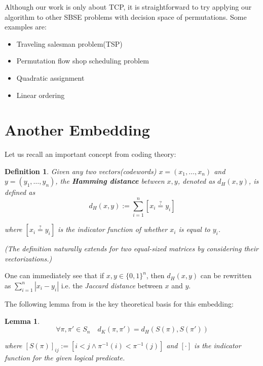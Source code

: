 \documentclass[10pt,journal,compsoc]{IEEEtran}
\newtheorem{definition}{Definition}[section]
\newtheorem{lemma}[theorem]{Lemma}
\begin{document}
	Although our work is only about TCP, it is straightforward to try applying our algorithm to other SBSE problems with decision space of permutations. Some examples are:
	\begin{itemize}
		\item Traveling salesman problem(TSP)
		
		\item Permutation flow shop scheduling problem
		
		\item Quadratic assignment
		
		\item Linear ordering
	\end{itemize}
	
	
	
	\appendices
	\section{Another Embedding}
	\label{sec:appendix}
	Let us recall an important concept from coding theory\cite{coding}:
	\begin{definition}
		Given any two vectors(codewords) $x = (x_1, \dots, x_n)$ and $y = (y_1, \dots, y_n)$, the {\bf Hamming distance} between $x, y$, denoted as $d_H(x, y)$, is defined as
		\[ d_H(x, y) := \sum_{i=1}^n \left[x_i \stackrel{?}{=} y_i\right] \]
		
		where $\left[x_i \stackrel{?}{=} y_i\right]$ is the indicator function of whether $x_i$ is equal to $y_i$.
		
		(The definition naturally extends for two equal-sized matrices by considering their vectorizations.)
	\end{definition}
	
	One can immediately see that if $x, y \in \{0, 1\}^n$, then $d_H(x, y)$ can be rewritten as $\sum_{i=1}^n |x_i - y_i|$ i.e. the {\it Jaccard distance} between $x$ and $y$.
	
	The following lemma from \cite{cormode} is the key theoretical basis for this embedding:
	\begin{lemma}
		\[ \forall \pi, \pi' \in S_n \quad d_K(\pi, \pi') = d_H \left( S(\pi), S(\pi') \right) \]
		
		where $[S(\pi)]_{ij} := [i < j \wedge \pi^{-1}(i) < \pi^{-1}(j)]$ and $[\cdot]$ is the indicator function for the given logical predicate.
	\end{lemma}
	
\end{document}
